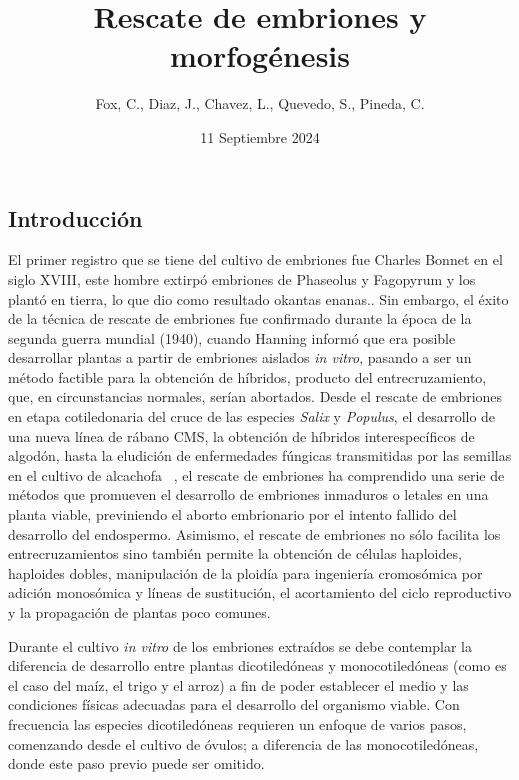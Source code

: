 \documentclass{article}
\title{\textbf{Rescate de embriones y morfogénesis}}
\author{Fox, C., Diaz, J., Chavez, L., Quevedo, S., Pineda, C.}
\date{11 Septiembre 2024}
\begin{document}
\maketitle 

\begin{multicols}{2}

\section{Introducción}
El primer registro que se tiene del cultivo de embriones fue Charles Bonnet en el siglo XVIII, este hombre extirpó embriones de Phaseolus y Fagopyrum y los plantó en tierra, lo que dio como resultado okantas enanas.\cite{14}. Sin embargo, el éxito de la técnica de rescate de embriones fue confirmado durante la época de la segunda guerra mundial (1940), cuando Hanning informó que era posible desarrollar plantas a partir de embriones aislados\textit{ in vitro}, pasando a ser un método factible para la obtención de híbridos, producto del entrecruzamiento, que, en circunstancias normales, serían abortados. Desde el rescate de embriones en etapa cotiledonaria del cruce de las especies \textit{Salix }y \textit{Populus}, el desarrollo de una nueva línea de rábano CMS, la obtención de híbridos interespecíficos de algodón, hasta la eludición de enfermedades fúngicas transmitidas por las semillas en el cultivo de alcachofa  \cite{5}, el rescate de embriones ha comprendido una serie de métodos que promueven el desarrollo de embriones inmaduros o letales en una planta viable, previniendo el aborto embrionario por el intento fallido del desarrollo del endospermo. Asimismo, el rescate de embriones no sólo facilita los entrecruzamientos sino también permite la obtención de células haploides, haploides dobles, manipulación de la ploidía para ingeniería cromosómica por adición monosómica y líneas de sustitución, el acortamiento del ciclo reproductivo y la propagación de plantas poco comunes. \cite{11} 

Durante el cultivo \textit{in vitro} de los embriones extraídos se debe contemplar la diferencia de desarrollo entre plantas dicotiledóneas y monocotiledóneas (como es el caso del maíz, el trigo y el arroz) a fin de poder establecer el medio y las condiciones físicas adecuadas para el desarrollo del organismo viable. Con frecuencia las especies dicotiledóneas requieren un enfoque de varios pasos, comenzando desde el cultivo de óvulos; a diferencia de las monocotiledóneas, donde este paso previo puede ser omitido. \cite{8}


\end{multicols}
\end{document}
